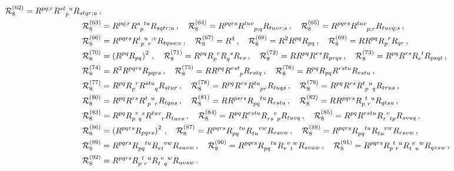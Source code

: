 \documentclass[11pt]{article}
\begin{document}
{\begin{align}
\mathcal{R}_{8}^{(62)} = R^{pq;r} \tensor{R}{^{st}_p^u} R_{stqr;u} \, ,
\nonumber\\
\mathcal{R}_{8}^{(63)} &= R^{pq;r} \tensor{R}{^s_p^{tu}} R_{sqtr;u} \, ,
\quad
\mathcal{R}_{8}^{(64)} = R^{pqrs} \tensor{R}{^{tuv}_{p;q}} R_{tuvr;s} \, ,
\quad
\mathcal{R}_{8}^{(65)} = R^{pqrs} \tensor{R}{^{tuv}_{p;r}} R_{tuvq;s} \, ,
\nonumber\\
\mathcal{R}_{8}^{(66)} &= R^{pqrs} \tensor{R}{^t_p^u_r^{;v}} R_{tqus;v} \, ,
\quad 
\mathcal{R}_{8}^{(67)} = R^4 \, ,
\quad 
\mathcal{R}_{8}^{(68)} = R^2 R^{pq} R_{pq} \, ,
\quad
\mathcal{R}_{8}^{(69)} = R R^{pq} \tensor{R}{_p^r} R_{qr} \, ,
\nonumber\\
\mathcal{R}_{8}^{(70)} &= \left( R^{pq} R_{pq} \right)^2 \, ,
\quad
\mathcal{R}_{8}^{(71)} = R^{pq} \tensor{R}{_p^r} \tensor{R}{_q^s} R_{rs} \, ,
\quad
\mathcal{R}_{8}^{(72)} = R R^{pq} R^{rs} R_{prqs} \, ,
\quad
\mathcal{R}_{8}^{(73)} = R^{pq} R^{rs} \tensor{R}{_r^t} R_{psqt} \, ,
\nonumber\\
\mathcal{R}_{8}^{(74)} &= R^2 R^{pqrs} R_{pqrs} \, ,
\quad
\mathcal{R}_{8}^{(75)} = R R^{pq} \tensor{R}{^{rst}_p} R_{rstq} \, ,
\quad
\mathcal{R}_{8}^{(76)} = R^{pq} R_{pq} R^{rstu} R_{rstu} \, ,
\nonumber\\
\mathcal{R}_{8}^{(77)} &= R^{pq} \tensor{R}{_p^r} \tensor{R}{^{stu}_q} R_{stur} \, ,
\quad 
\mathcal{R}_{8}^{(78)} = R^{pq} R^{rs} \tensor{R}{^{tu}_{pr}} R_{tuqs} \, , 
\quad
\mathcal{R}_{8}^{(79)} = R^{pq} R^{rs} \tensor{R}{^t_p^u_q} R_{trus} \, ,
\nonumber\\
\mathcal{R}_{8}^{(80)} &= R^{pq} R^{rs} \tensor{R}{^t_p^u_r} R_{tqus} \, ,
\quad
\mathcal{R}_{8}^{(81)} = R R^{psrs} \tensor{R}{_{pq}^{tu}} R_{rstu} \, ,
\quad
\mathcal{R}_{8}^{(82)} = R R^{pqrs} \tensor{R}{_p^t_r^u} R_{qtsu} \, ,
\nonumber\\
\mathcal{R}_{8}^{(83)} &= R^{pq} \tensor{R}{_p^r_q^s} \tensor{R}{^{tuv}_r} \tensor{R}{_{tuvs}} \, ,
\quad
\mathcal{R}_{8}^{(84)} = R^{pq} R^{rstu} \tensor{R}{_{rs}^v_p}R_{tuvq} \, ,
\quad 
\mathcal{R}_{8}^{(85)} = R^{pq} R^{rstu} \tensor{R}{_r^v_{tp}} R_{svuq} \, ,
\nonumber\\
\mathcal{R}_{8}^{(86)} &= \left( R^{pqrs} R_{pqrs} \right)^2 \, ,
\quad 
\mathcal{R}_{8}^{(87)} = R^{pqrs} \tensor{R}{_{pq}^{tu}} \tensor{R}{_{tu}^{vw}} R_{rsvw} \, ,
\quad
\mathcal{R}_{8}^{(88)} = R^{pqrs} \tensor{R}{_{pq}^{tu}} \tensor{R}{_{tu}^{vw}} R_{rsvw} \, ,
\nonumber\\
\mathcal{R}_{8}^{(89)} &= R^{pqrs} \tensor{R}{_{pq}^{tu}} \tensor{R}{_{rt}^{vw}} R_{suvw} \, ,
\quad
\mathcal{R}_{8}^{(90)} = R^{pqrs} \tensor{R}{_{pq}^{tu}} \tensor{R}{_r^v_t^w} R_{svuw} \, ,
\quad 
\mathcal{R}_{8}^{(91)} = R^{pqrs} \tensor{R}{_p^t_r^u} \tensor{R}{_t^v_u^w} R_{qvsw} \, ,
\nonumber\\
\mathcal{R}_{8}^{(92)} &= R^{pqrs} \tensor{R}{_p^t_r^u} \tensor{R}{_t^v_q^w} R_{uvsw}  \, .
\end{align}

}
\end{document}
